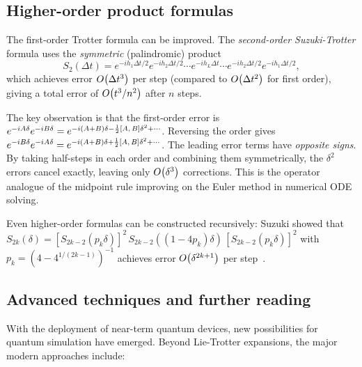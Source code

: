 \subsection{Higher-order product formulas}\label{subsec:higher-order}

The first-order Trotter formula can be improved.  The \emph{second-order
  Suzuki-Trotter} formula uses the \emph{symmetric} (palindromic) product
\begin{equation}
  S_2(\Delta t) = e^{-ih_1 \Delta t/2}e^{-ih_2 \Delta t/2}\cdots
  e^{-ih_L \Delta t}\cdots e^{-ih_2 \Delta t/2}e^{-ih_1 \Delta t/2},
\end{equation}
which achieves error $O\!\left(\Delta t^3\right)$ per step (compared to
$O\!\left(\Delta t^2\right)$ for first order), giving a total error of
$O\!\left(t^3/n^2\right)$ after $n$ steps.

\begin{intuition}
  The key observation is that the first-order error is
  $e^{-iA\delta}e^{-iB\delta} = e^{-i(A+B)\delta -\frac{1}{2}[A,\,B]\delta^2 + \cdots}$.
  Reversing the order gives
  $e^{-iB\delta}e^{-iA\delta} = e^{-i(A+B)\delta +\frac{1}{2}[A,\,B]\delta^2 + \cdots}$.
  The leading error terms have \emph{opposite signs}.  By taking half-steps
  in each order and combining them symmetrically, the $\delta^2$ errors
  cancel exactly, leaving only $O\!\left(\delta^3\right)$ corrections.  This is
  the operator analogue of the midpoint rule improving on the Euler method
  in numerical ODE solving.
\end{intuition}

Even higher-order formulas can be constructed recursively: Suzuki showed
that $S_{2k}(\delta) = [S_{2k-2}(p_k\delta)]^2\, S_{2k-2}((1-4p_k)\delta)\,
[S_{2k-2}(p_k\delta)]^2$ with $p_k = (4-4^{1/(2k-1)})^{-1}$ achieves
error $O\!\left(\delta^{2k+1}\right)$ per step~\cite{ChildsTrotterError2021}.


\subsection{Advanced techniques and further reading}\label{subsec:advanced}

With the deployment of near-term quantum devices, new possibilities for
quantum simulation have emerged.  Beyond Lie-Trotter expansions, the major
modern approaches include:


